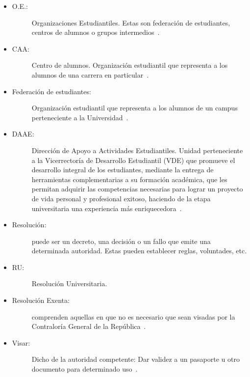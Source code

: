 \begin{itemize}
	\item 	\begin{description}
			    \item[O.E.:] Organizaciones Estudiantiles. Estas son federación de estudiantes, centros de alumnos o grupos intermedios~\cite{2}.
			\end{description}

	\item 	\begin{description}
			    \item[CAA:] Centro de alumnos. Organización estudiantil que representa a los alumnos de una carrera en particular~\cite{3}.
			\end{description}

	\item 	\begin{description}
			    \item[Federación de estudiantes:] Organización estudiantil que representa a los alumnos de un campus perteneciente a la Universidad~\cite{2}.
			\end{description}

	\item 	\begin{description}
				\item[DAAE:] Dirección de Apoyo a Actividades Estudiantiles. Unidad perteneciente a la Vicerrectoría de Desarrollo Estudiantil (VDE) que promueve el desarrollo integral de los estudiantes, mediante la entrega de herramientas complementarias a su formación académica, que les permitan adquirir las competencias necesarias para lograr un proyecto de vida personal y profesional exitoso, haciendo de la etapa universitaria una experiencia más enriquecedora~\cite{1}.
			\end{description}

	\item 	\begin{description}
			    \item[Resolución:] puede ser un decreto, una decisión o un fallo que emite una determinada autoridad. Estas pueden establecer reglas, voluntades, etc.
			\end{description}
	
	\item 	\begin{description}
				\item[RU:] Resolución Universitaria.
			\end{description}

	\item 	\begin{description}
			    \item[Resolución Exenta:] comprenden aquellas en que no es necesario que sean visadas por la Contraloría General de la República~\cite{3}.
			\end{description}

	\item 	\begin{description}
			    \item[Visar:] Dicho de la autoridad competente: Dar validez a un pasaporte u otro documento para determinado uso~\cite{4}.
			\end{description} 

\end{itemize}


